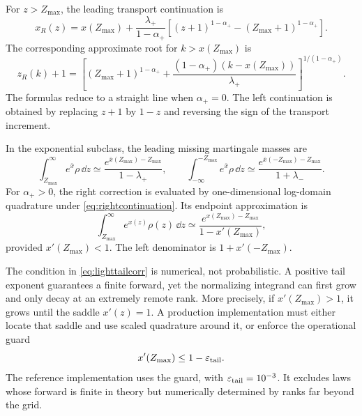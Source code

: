 For $z>Z_{\max}$, the leading transport continuation is
\begin{equation}
x_R(z)=x(Z_{\max})+
\frac{\lambda_+}{1-\alpha_+}
\left[(z+1)^{1-\alpha_+}
-(Z_{\max}+1)^{1-\alpha_+}\right].
\label{eq:rightcontinuation}
\end{equation}
The corresponding approximate root for $k>x(Z_{\max})$ is
\begin{equation}
z_R(k)+1=\left[(Z_{\max}+1)^{1-\alpha_+}
+\frac{(1-\alpha_+)(k-x(Z_{\max}))}{\lambda_+}
\right]^{1/(1-\alpha_+)}.
\label{eq:rightroot}
\end{equation}
The formulas reduce to a straight line when $\alpha_+=0$.  The left
continuation is obtained by replacing $z+1$ by $1-z$ and reversing the sign of
the transport increment.

In the exponential subclass, the leading missing martingale masses are
\begin{equation}
\int_{Z_{\max}}^\infty e^{\bar x}\rho\,\dd z
\simeq\frac{e^{\bar x(Z_{\max})-Z_{\max}}}{1-\lambda_+},
\qquad
\int_{-\infty}^{-Z_{\max}} e^{\bar x}\rho\,\dd z
\simeq\frac{e^{\bar x(-Z_{\max})-Z_{\max}}}{1+\lambda_-}.
\label{eq:tailcorr}
\end{equation}
For $\alpha_+>0$, the right correction is evaluated by one-dimensional
log-domain quadrature under \eqref{eq:rightcontinuation}.  Its endpoint
approximation is
\begin{equation}
\int_{Z_{\max}}^\infty e^{x(z)}\rho(z)\,\dd z
\simeq
\frac{e^{x(Z_{\max})-Z_{\max}}}{1-x'(Z_{\max})},
\label{eq:lighttailcorr}
\end{equation}
provided $x'(Z_{\max})<1$.  The left denominator is
$1+x'(-Z_{\max})$.

The condition in \eqref{eq:lighttailcorr} is numerical, not probabilistic.  A
positive tail exponent guarantees a finite forward, yet the normalizing
integrand can first grow and only decay at an extremely remote rank.  More
precisely, if $x'(Z_{\max})>1$, it grows until the saddle $x'(z)=1$.  A
production implementation must either locate that saddle and use scaled
quadrature around it, or enforce the operational guard
\begin{equation}
x'(Z_{\max})\le1-\varepsilon_{\rm tail}.
\label{eq:operationaltailguard}
\end{equation}
The reference implementation uses the guard, with
$\varepsilon_{\rm tail}=10^{-3}$.  It excludes laws whose forward
is finite in theory but numerically determined by ranks far beyond the grid.

